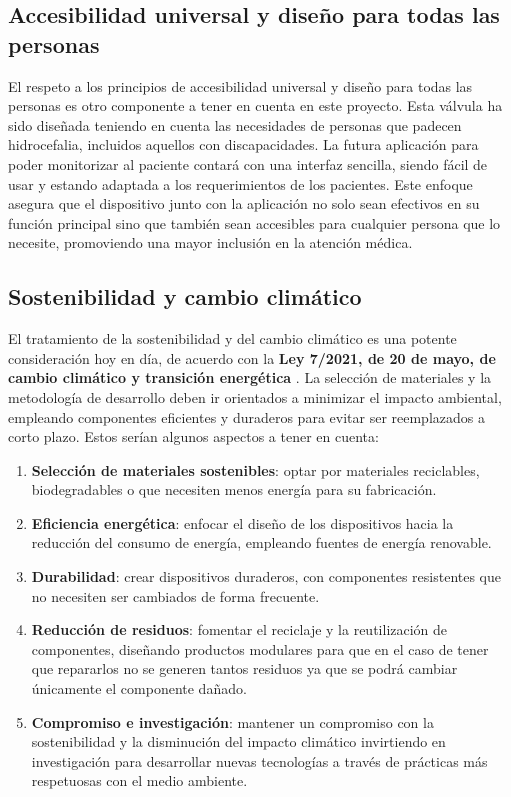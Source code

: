 \subsection{Accesibilidad universal y diseño para todas las personas}
El respeto a los principios de accesibilidad universal y diseño para todas las personas es otro componente a tener en cuenta en este proyecto. Esta válvula ha sido diseñada teniendo en cuenta las necesidades de personas que padecen hidrocefalia, incluidos aquellos con discapacidades. La futura aplicación para poder monitorizar al paciente contará con una interfaz sencilla, siendo fácil de usar y estando adaptada a los requerimientos de los pacientes. Este enfoque asegura que el dispositivo junto con la aplicación no solo sean efectivos en su función principal sino que también sean accesibles para cualquier persona que lo necesite, promoviendo una mayor inclusión en la atención médica.

\subsection{Sostenibilidad y cambio climático}
El tratamiento de la sostenibilidad y del cambio climático es una potente consideración hoy en día, de acuerdo con la \textbf{Ley 7/2021, de 20 de mayo, de cambio climático y transición energética} \cite{ley-cc}. La selección de materiales y la metodología de desarrollo deben ir orientados a minimizar el impacto ambiental, empleando componentes eficientes y duraderos para evitar ser reemplazados a corto plazo. Estos serían algunos aspectos a tener en cuenta:
\begin{enumerate}
    \item \textbf{Selección de materiales sostenibles}: optar por materiales reciclables, biodegradables o que necesiten menos energía para su fabricación.
    \item \textbf{Eficiencia energética}: enfocar el diseño de los dispositivos hacia la reducción del consumo de energía, empleando fuentes de energía renovable.
    \item \textbf{Durabilidad}: crear dispositivos duraderos, con componentes resistentes que no necesiten ser cambiados de forma frecuente.
    \item \textbf{Reducción de residuos}: fomentar el reciclaje y la reutilización de componentes, diseñando productos modulares para que en el caso de tener que repararlos no se generen tantos residuos ya que se podrá cambiar únicamente el componente dañado.
    \item \textbf{Compromiso e investigación}: mantener un compromiso con la sostenibilidad y la disminución del impacto climático invirtiendo en investigación para desarrollar nuevas tecnologías a través de prácticas más respetuosas con el medio ambiente.
\end{enumerate}

